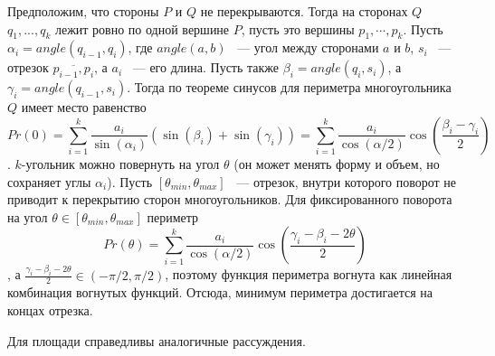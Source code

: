 Предположим, что стороны $P$ и $Q$ не перекрываются. Тогда на сторонах
$Q$ $q_1, ..., q_k$ лежит ровно по одной вершине $P$,
пусть это вершины $p_1, \cdots, p_k$. Пусть $\alpha_i = angle(q_{i-1}, q_i)$,
где $angle(a, b)$ ~--- угол между сторонами $a$ и $b$, $s_i$ ~---
отрезок $\overline{p_{i-1}, p_i}$, а $a_i$ ~--- его длина. Пусть также
$\beta_i = angle(q_i, s_i)$, а $\gamma_i = angle(q_{i - 1},s_i)$.
Тогда по теореме синусов для периметра многоугольника $Q$ имеет место
равенство
$$
Pr(0) = \sum_{i=1}^{k}\frac{a_i}{\sin(\alpha_i)}(\sin(\beta_i) + \sin(\gamma_i))=
\sum_{i=1}^{k}\frac{a_i}{\cos(\alpha/2)}\cos(\frac{\beta_i-\gamma_i}{2})
$$.
$k$-угольник можно повернуть на угол $\theta$ (он может менять форму и объем,
но сохраняет углы $\alpha_i$). Пусть $[\theta_{min}, \theta_{max}]$ ~---
отрезок, внутри которого поворот не приводит к перекрытию сторон
многоугольников. Для фиксированного поворота на угол
$\theta \in [\theta_{min}, \theta_{max}]$ периметр
$$
Pr(\theta) =
\sum_{i=1}^{k}\frac{a_i}{\cos(\alpha/2)}\cos(\frac{\gamma_i-\beta_i-2\theta}{2})
$$, а $\frac{\gamma_i-\beta_i-2\theta}{2} \in (-\pi/2, \pi/2)$, поэтому
функция периметра вогнута как линейная комбинация вогнутых функций. Отсюда,
минимум периметра достигается на концах отрезка.

Для площади справедливы аналогичные рассуждения.

